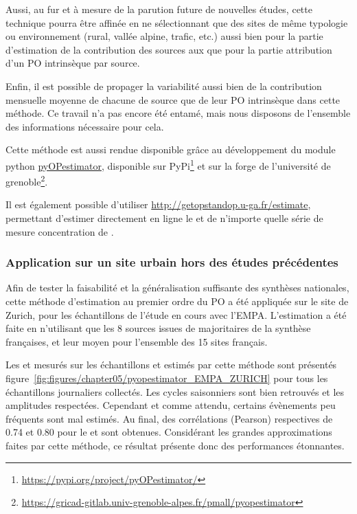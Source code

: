 Aussi, au fur et à mesure de la parution future de nouvelles études, cette technique pourra être 
affinée en ne sélectionnant que des sites de même typologie ou
environnement (rural, vallée alpine, trafic, etc.) aussi bien pour la partie d'estimation
de la contribution des sources aux \PMdix{} que pour la partie attribution d'un PO
intrinsèque par source.

Enfin, il est possible de propager la variabilité aussi bien de la contribution mensuelle
moyenne de chacune de source que de leur PO intrinsèque dans cette méthode. Ce travail n'a
pas encore été entamé, mais nous disposons de l'ensemble des informations nécessaire pour
cela.

\begin{tcolorbox}[colback=red!5!white,colframe=Melon,title=Note]
    Cette méthode est aussi rendue disponible grâce au développement du module python
    \href{https://gricad-gitlab.univ-grenoble-alpes.fr/pmall/pyopestimator}{pyOPestimator},
    disponible sur PyPi\footnote{\url{https://pypi.org/project/pyOPestimator/}} et sur la
    forge de l'université de
    grenoble\footnote{\url{https://gricad-gitlab.univ-grenoble-alpes.fr/pmall/pyopestimator}}.

    Il est également possible d'utiliser \url{http://getopstandop.u-ga.fr/estimate},
    permettant d'estimer directement en ligne le \POAAv{} et \PODTTv{} de n'importe quelle
    série de mesure concentration de \PMdix.
\end{tcolorbox}

\subsubsection{Application sur un site urbain hors des études précédentes}

Afin de tester la faisabilité et la généralisation suffisante des synthèses nationales,
cette méthode d'estimation au premier ordre du PO a été appliquée sur le site de Zurich,
pour les échantillons de l'étude en cours avec l'EMPA. 
L'estimation a été faite en n'utilisant que les 8 sources issues de majoritaires de la
synthèse françaises, et leur \OPm{} moyen pour l'ensemble des 15 sites français.

Les \POAAv{} et \PODTTv{} mesurés sur les échantillons et estimés par cette méthode sont
présentés figure~\ref{fig:figures/chapter05/pyopestimator_EMPA_ZURICH} pour tous les
échantillons journaliers collectés.  Les cycles saisonniers sont bien retrouvés et les
amplitudes respectées. Cependant et comme attendu, certains évènements peu fréquents sont
mal estimés. Au final, des corrélations (Pearson) respectives de 0.74 et 0.80 pour le
\POAAv{} et \PODTTv{} sont obtenues.  Considérant les grandes approximations faites par cette
méthode, ce résultat présente donc des performances étonnantes.

